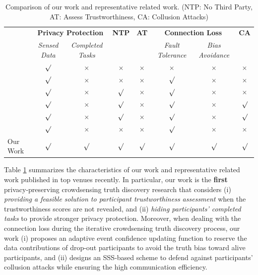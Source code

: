 \documentclass[11pt]{article}
\begin{document}
\begin{table}[t]
	\footnotesize
	\centering
	\caption{Comparison of our work and representative related work. (NTP: No Third Party, AT: Assess Trustworthiness,  CA: Collusion Attacks)}
	\label{tab:related_work}
	\begin{tabular}{@{}lccccccc@{}}
		\toprule
		\textbf{} &
		\multicolumn{2}{c}{\textbf{Privacy Protection}}
		&
		\textbf{NTP} &
		\textbf{AT} &
		\multicolumn{2}{c}{\textbf{Connection Loss}} & \textbf{CA} \\
		&
		\textit{Sensed Data} &
		\textit{Completed Tasks}
		&
		&
		& \textit{Fault Tolerance} & \textit{Bias Avoidance}
		& \\
		\midrule
		\cite{Leye-Miao2017ALP} & $\surd$  & $\times$ & $\times$ & $\times$  & $\times$ & $\times$ & $\times$ \\
		\cite{Leye-Zheng2018LearningTT} & $\surd$  & $\times$ & $\times$ & $\times$  & $\surd$ & $\times$ & $\times$ \\
		\cite{Leye-Miao2019PrivacyPreservingTD}  & $\surd$  & $\times$ & $\surd$ & $\times$  & $\surd$ & $\times$  & $\times$ \\
		\cite{Leye-Xu2019EfficientAP}  & $\surd$ & $\times$ & $\surd$ & $\times$ & $\surd$ & $\times$ & $\surd$ \\
		\cite{Leye-Zheng2020PrivacyAwareAE} & $\surd$ & $\times$ & $\surd$ & $\times$ & $\surd$ & $\times$ & $\surd$ \\
		\cite{Leye-Zhang2021ReliableAP}  & $\surd$ & $\times$ & $\times$ & $\times$ & $
		\surd$ & $\times$ & $\times$\\
		Our Work & $\surd$ & $\surd$ & $\surd$ & $\surd$ & $\surd$ & $\surd$ & $\surd$ \\ \bottomrule
	\end{tabular}
\end{table}


Table \ref{tab:related_work} summarizes the characteristics of our work and representative related work published in top venues recently. In particular, our work is the \textbf{first} privacy-preserving crowdsensing truth discovery research that considers (i) \textit{providing a feasible solution to participant trustworthiness assessment} when the trustworthiness scores are not revealed, and (ii) \textit{hiding participants' completed tasks} to provide stronger privacy protection. Moreover, when dealing with the connection loss during the iterative crowdsensing truth discovery process, our work (i) proposes an adaptive event confidence updating function to reserve the data contributions of drop-out participants to avoid the truth bias toward alive participants, and (ii) designs an SSS-based scheme to defend against participants' collusion attacks while ensuring the high communication efficiency.
\end{document}
